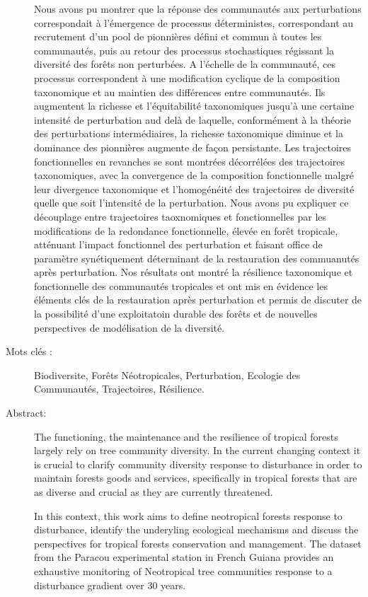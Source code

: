 \documentclass[
  11pt,
  french,
  A4paper,
  extrafontsizes,onecolumn,openright
  ]{memoir}
\begin{document}
\begin{normalsize}
\begin{description}
Nous avons pu montrer que la réponse des communautés aux perturbations
correspondait à l'émergence de processus déterministes, correspondant au
recrutement d'un pool de pionnières défini et commun à toutes les
communautés, puis au retour des processus stochastiques régissant la
diversité des forêts non perturbées. A l'échelle de la communauté, ces
processus correspondent à une modification cyclique de la composition
taxonomique et au maintien des différences entre communautés. Ils
augmentent la richesse et l'équitabilité taxonomiques jusqu'à une
certaine intensité de perturbation aud delà de laquelle, conformément à
la théorie des perturbations intermédiaires, la richesse taxonomique
diminue et la dominance des pionnières augmente de façon persistante.
Les trajectoires fonctionnelles en revanches se sont montrées
décorrélées des trajectoires taxonomiques, avec la convergence de la
composition fonctionnelle malgré leur divergence taxonomique et
l'homogénéité des trajectoires de diversité quelle que soit l'intensité
de la perturbation. Nous avons pu expliquer ce découplage entre
trajectoires taoxnomiques et fonctionnelles par les modifications de la
redondance fonctionnelle, élevée en forêt tropicale, atténuant l'impact
fonctionnel des perturbation et faisant office de paramètre
synétiquement déterminant de la restauration des commuanutés après
perturbation. Nos résultats ont montré la résilience taxonomique et
fonctionnelle des communautés tropicales et ont mis en évidence les
éléments clés de la restauration après perturbation et permis de
discuter de la possibilité d'une exploitatoin durable des forêts et de
nouvelles perspectives de modélisation de la diversité.

\item[Mots clés :]
Biodiversite, Forêts Néotropicales, Perturbation, Ecologie des Communautés, Trajectoires, Résilience.
~\\

\item[Abstract:]
The functioning, the maintenance and the resilience of tropical forests
largely rely on tree community diversity. In the current changing
context it is crucial to clarify community diversity response to
disturbance in order to maintain forests goods and services,
specifically in tropical forests that are as diverse and crucial as they
are currently threatened.

In this context, this work aims to define neotropical forests response
to disturbance, identify the underyling ecological mechanisms and
discuss the perspectives for tropical forests conservation and
management. The dataset from the Paracou experimental station in French
Guiana provides an exhaustive monitoring of Neotropical tree communities
response to a disturbance gradient over 30 years.


\end{description}
\end{normalsize}
\end{document}
